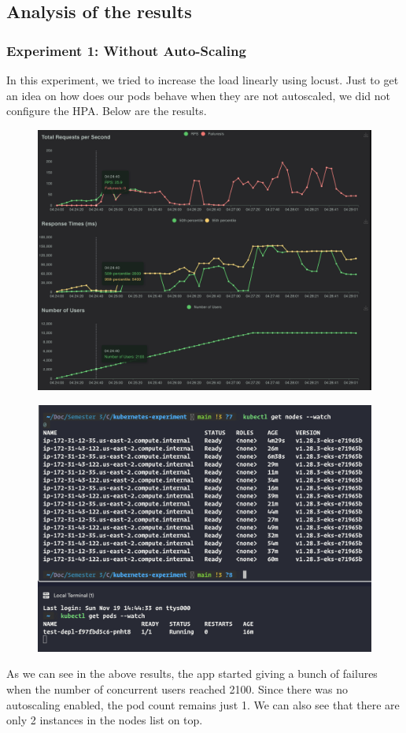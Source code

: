 \documentclass{article}
\begin{document}
\subsection{Analysis of the results}
\subsubsection{Experiment 1: Without Auto-Scaling}
In this experiment, we tried to increase the load linearly using locust. Just to get an idea on how does our pods behave when they are not autoscaled, we did not configure the HPA. Below are the results. 
\begin{figure}[H]
    \centering
    \includegraphics[width=0.9\linewidth]{images/exp1_results.png}
\end{figure}
\begin{figure}[H]
    \centering
    \includegraphics[width=0.7\linewidth]{images/exp1_watch.png}
\end{figure}
As we can see in the above results, the app started giving a bunch of failures when the number of concurrent users reached 2100. Since there was no autoscaling enabled, the pod count remains just 1.  We can also see that there are only 2 instances in the nodes list on top. 
\end{document}
